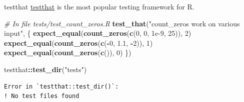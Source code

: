 \documentclass[
  ignorenonframetext,
  aspectratio=1610,
  onlytextwidth]{beamer}
\newenvironment{Shaded}{\begin{snugshade}}{\end{snugshade}}
\newcommand{\CommentTok}[1]{\textcolor[rgb]{0.56,0.35,0.01}{\textit{#1}}}
\newcommand{\DecValTok}[1]{\textcolor[rgb]{0.00,0.00,0.81}{#1}}
\newcommand{\FloatTok}[1]{\textcolor[rgb]{0.00,0.00,0.81}{#1}}
\newcommand{\FunctionTok}[1]{\textcolor[rgb]{0.13,0.29,0.53}{\textbf{#1}}}
\newcommand{\NormalTok}[1]{#1}
\newcommand{\SpecialCharTok}[1]{\textcolor[rgb]{0.81,0.36,0.00}{\textbf{#1}}}
\newcommand{\StringTok}[1]{\textcolor[rgb]{0.31,0.60,0.02}{#1}}
\begin{document}
\begin{frame}[fragile]{testthat}
\label{testthat}
\href{https://testthat.r-lib.org/}{testthat} is the most popular testing
framework for R.

\pause

\begin{Shaded}
\begin{Highlighting}[]
\CommentTok{\# In file tests/test\_count\_zeros.R}
\FunctionTok{test\_that}\NormalTok{(}\StringTok{"count\_zeros work on various input"}\NormalTok{, \{}
  \FunctionTok{expect\_equal}\NormalTok{(}\FunctionTok{count\_zeros}\NormalTok{(}\FunctionTok{c}\NormalTok{(}\DecValTok{0}\NormalTok{, }\DecValTok{0}\NormalTok{, }\FloatTok{1e{-}9}\NormalTok{, }\DecValTok{25}\NormalTok{)), }\DecValTok{2}\NormalTok{)}
  \FunctionTok{expect\_equal}\NormalTok{(}\FunctionTok{count\_zeros}\NormalTok{(}\FunctionTok{c}\NormalTok{(}\SpecialCharTok{{-}}\DecValTok{0}\NormalTok{, }\FloatTok{1.1}\NormalTok{, }\SpecialCharTok{{-}}\DecValTok{2}\NormalTok{)), }\DecValTok{1}\NormalTok{)}
  \FunctionTok{expect\_equal}\NormalTok{(}\FunctionTok{count\_zeros}\NormalTok{(}\FunctionTok{c}\NormalTok{()), }\DecValTok{0}\NormalTok{)}
\NormalTok{\})}
\end{Highlighting}
\end{Shaded}

\begin{Shaded}
\begin{Highlighting}[]
\NormalTok{testthat}\SpecialCharTok{::}\FunctionTok{test\_dir}\NormalTok{(}\StringTok{"tests"}\NormalTok{)}
\end{Highlighting}
\end{Shaded}

\begin{verbatim}
Error in `testthat::test_dir()`:
! No test files found
\end{verbatim}
\end{frame}
\end{document}
